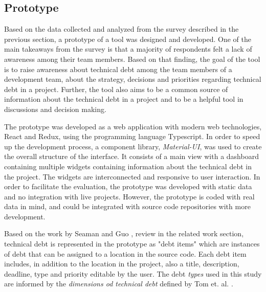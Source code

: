 \subsection{Prototype}
Based on the data collected and analyzed from the survey described in the previous section, a prototype of a tool was designed and developed.
One of the main takeaways from the survey is that a majority of respondents felt a lack of awareness among their team members.
Based on that finding, the goal of the tool is to raise awareness about technical debt among the team members of a development team, about the strategy, decisions and priorities regarding technical debt in a project.
Further, the tool also aims to be a common source of information about the technical debt in a project and to be a helpful tool in discussions and decision making.

The prototype was developed as a web application with modern web technologies, React and Redux, using the programming language Typescript.
In order to speed up the development process, a component library, \textit{Material-UI}, was used to create the overall structure of the interface.
It consists of a main view with a dashboard containing multiple widgets containing information about the technical debt in the project.
The widgets are interconnected and responsive to user interaction.
In order to facilitate the evaluation, the prototype was developed with static data and no integration with live projects.
However, the prototype is coded with real data in mind, and could be integrated with source code repositories with more development.



Based on the work by Seaman and Guo \cite{seaman_measuring_2011}, review in the related work section, technical debt is represented in the prototype as "debt items" which are instances of debt that can be assigned to a location in the source code.
Each debt item includes, in addition to the location in the project, also a title, description, deadline, type and priority editable by the user.
The debt \textit{types} used in this study are informed by the \textit{dimensions od technical debt} defined by Tom et. al. \cite{tom_exploration_2013}.

